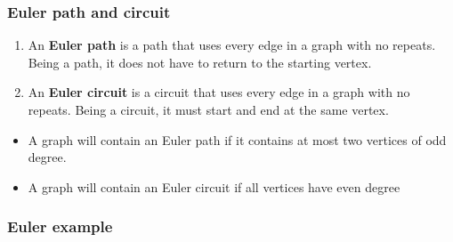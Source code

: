\documentclass{beamer}
\theoremstyle{definition}
\begin{document}
\begin{frame}
\frametitle{Euler path and circuit}
\begin{definition}
\begin{enumerate}
\item 
An \textbf{Euler path} is a path that uses every edge in a graph with no repeats.  Being a path, it does not have to return to the starting vertex.
\item An \textbf{Euler circuit} is a circuit that uses every edge in a graph with no repeats.  Being a circuit, it must start and end at the same vertex.
\end{enumerate}
\end{definition}
\pause
\begin{theorem}
\begin{itemize}
\item A graph will contain an Euler path if it contains at most two vertices of odd degree.
\item A graph will contain an Euler circuit if all vertices have even degree
\end{itemize}
\end{theorem}
\end{frame}

\begin{frame}
\frametitle{Euler example}
\begin{center}
\end{center}
\end{frame}
\end{document}
